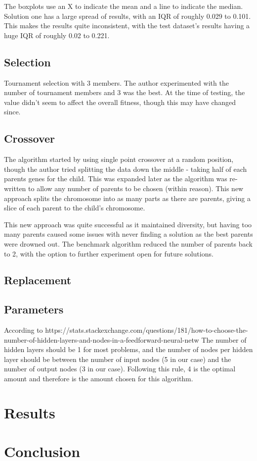 \documentclass[sigconf]{acmart}
\begin{document}
The boxplots use an X to indicate the mean and a line to indicate the median. Solution one has a large spread of results, with an IQR of roughly 0.029 to 0.101. This makes the results quite inconsistent, with the test dataset's results having a huge IQR of roughly 0.02 to 0.221.
\subsection{Selection}
Tournament selection with 3 members. The author experimented with the number of tournament members and 3 was the best. At the time of testing, the value didn't seem to affect the overall fitness, though this may have changed since.
\subsection{Crossover}
The algorithm started by using single point crossover at a random position, though the author tried splitting the data down the middle - taking half of each parents genes for the child. This was expanded later as the algorithm was re-written to allow any number of parents to be chosen (within reason). This new approach splits the chromosome into as many parts as there are parents, giving a slice of each parent to the child's chromosome.

This new approach was quite successful as it maintained diversity, but having too many parents caused some issues with never finding a solution as the best parents were drowned out. The benchmark algorithm reduced the number of parents back to 2, with the option to further experiment open for future solutions.
\subsection{Replacement}
\subsection{Parameters}
According to
https://stats.stackexchange.com/questions/181/how-to-choose-the-number-of-hidden-layers-and-nodes-in-a-feedforward-neural-netw
The number of hidden layers should be 1 for most problems, and the number of nodes per hidden layer should be between the number of input nodes (5 in our case) and the number of output nodes (3 in our case). Following this rule, 4 is the optimal amount and therefore is the amount chosen for this algorithm.
\section{Results}
\section{Conclusion}

%
 
\end{document}
